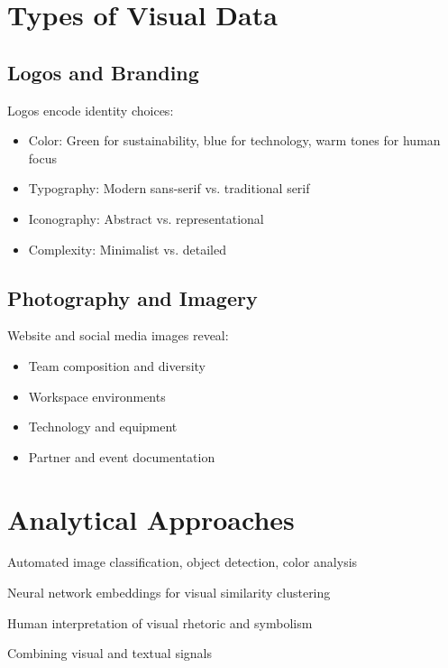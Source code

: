 \documentclass[../main.tex]{subfiles}
\begin{document}
\section*{Types of Visual Data}

\subsection*{Logos and Branding}

Logos encode identity choices:
\begin{itemize}[leftmargin=*, itemsep=0.2em]
\item Color: Green for sustainability, blue for technology, warm tones for human focus
\item Typography: Modern sans-serif vs. traditional serif
\item Iconography: Abstract vs. representational
\item Complexity: Minimalist vs. detailed
\end{itemize}

\subsection*{Photography and Imagery}

Website and social media images reveal:
\begin{itemize}[leftmargin=*, itemsep=0.2em]
\item Team composition and diversity
\item Workspace environments
\item Technology and equipment
\item Partner and event documentation
\end{itemize}


\section*{Analytical Approaches}

\begin{description}[leftmargin=0.5cm, itemsep=0.3em]
\item[Computer Vision] Automated image classification, object detection, color analysis
\item[Embedding Similarity] Neural network embeddings for visual similarity clustering
\item[Qualitative Coding] Human interpretation of visual rhetoric and symbolism
\item[Multimodal Integration] Combining visual and textual signals
\end{description}
\end{document}
